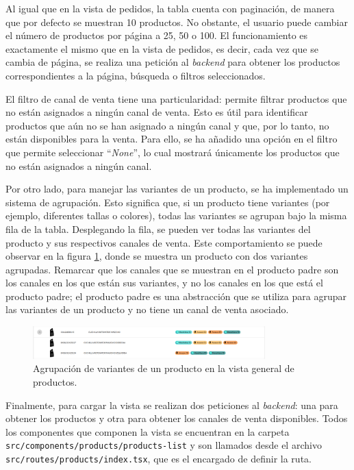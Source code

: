 Al igual que en la vista de pedidos, la tabla cuenta con paginación, de manera que por defecto se muestran 10 productos. No obstante, el usuario puede cambiar el número de productos por página a 25, 50 o 100. El funcionamiento es exactamente el mismo que en la vista de pedidos, es decir, cada vez que se cambia de página, se realiza una petición al \textit{backend} para obtener los productos correspondientes a la página, búsqueda o filtros seleccionados.

El filtro de canal de venta tiene una particularidad: permite filtrar productos que no están asignados a ningún canal de venta. Esto es útil para identificar productos que aún no se han asignado a ningún canal y que, por lo tanto, no están disponibles para la venta. Para ello, se ha añadido una opción en el filtro que permite seleccionar ``\textit{None}'', lo cual mostrará únicamente los productos que no están asignados a ningún canal.

Por otro lado, para manejar las variantes de un producto, se ha implementado un sistema de agrupación. Esto significa que, si un producto tiene variantes (por ejemplo, diferentes tallas o colores), todas las variantes se agrupan bajo la misma fila de la tabla. Desplegando la fila, se pueden ver todas las variantes del producto y sus respectivos canales de venta. Este comportamiento se puede observar en la figura \ref{fig:dev:ss:variantes_productos}, donde se muestra un producto con dos variantes agrupadas. Remarcar que los canales que se muestran en el producto padre son los canales en los que están sus variantes, y no los canales en los que está el producto padre; el producto padre es una abstracción que se utiliza para agrupar las variantes de un producto y no tiene un canal de venta asociado.

\begin{figure}[H]
    \centering
    \includegraphics[width=0.8\textwidth]{figures/design_develop/screenshots/variantes_producto.png}
    \caption{Agrupación de variantes de un producto en la vista general de productos.}
    \label{fig:dev:ss:variantes_productos}
\end{figure}

Finalmente, para cargar la vista se realizan dos peticiones al \textit{backend}: una para obtener los productos y otra para obtener los canales de venta disponibles. Todos los componentes que componen la vista se encuentran en la carpeta \texttt{src/components/products/products-list} y son llamados desde el archivo \texttt{src/routes/products/index.tsx}, que es el encargado de definir la ruta.

